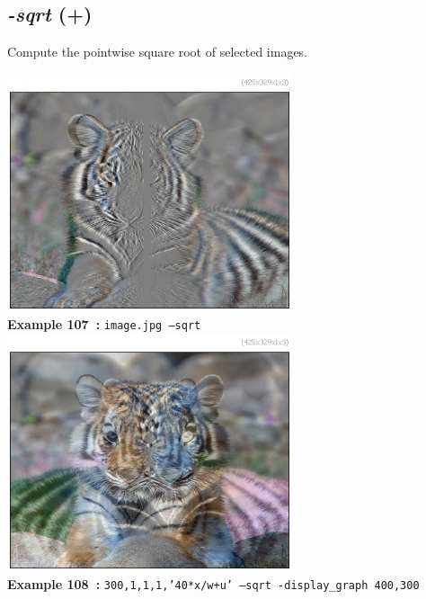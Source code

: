 \documentclass[a4paper,11pt,twoside]{book}
\begin{document}
\subsection{\emph{-sqrt} (+)}\vspace*{-0.5em}
Compute the pointwise square root of selected images.
\begin{center}\includegraphics[keepaspectratio=true,height=7cm,width=\textwidth]{img/gmic_def107.jpg}\\
{\footnotesize \textbf{Example 107~:} \texttt{image.jpg --sqrt}}
\\\includegraphics[keepaspectratio=true,height=7cm,width=\textwidth]{img/gmic_def108.jpg}\\
{\footnotesize \textbf{Example 108~:} \texttt{300,1,1,1,'40*x/w+u' --sqrt -display\_graph 400,300}}
\end{center}
\end{document}
